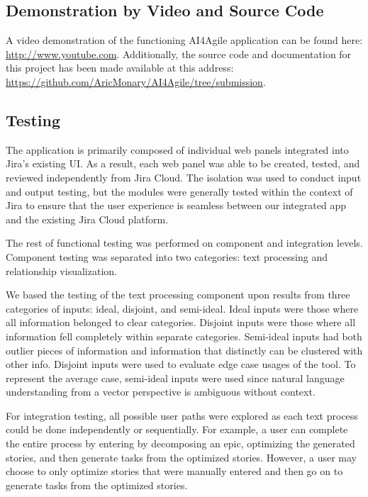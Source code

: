 \subsection{Demonstration by Video and Source Code}
A video demonstration of the functioning AI4Agile application can be found here: \url{http://www.youtube.com}. Additionally, the source code and documentation for this project has been made available at this address: \url{https://github.com/AricMonary/AI4Agile/tree/submission}.

\subsection{Testing}

The application is primarily composed of individual web panels integrated into Jira’s existing UI. As a result, each web panel was able to be created, tested, and reviewed independently from Jira Cloud. The isolation was used to conduct input and output testing, but the modules were generally tested within the context of Jira to ensure that the user experience is seamless between our integrated app and the existing Jira Cloud platform.

The rest of functional testing was performed on component and integration levels. Component testing was separated into two categories: text processing and relationship visualization.

We based the testing of the text processing component upon results from three categories of inputs: ideal, disjoint, and semi-ideal. Ideal inputs were those where all information belonged to clear categories. Disjoint inputs were those where all information fell completely within separate categories. Semi-ideal inputs had both outlier pieces of information and information that distinctly can be clustered with other info. Disjoint inputs were used to evaluate edge case usages of the tool. To represent the average case, semi-ideal inputs were used since natural language understanding from a vector perspective is ambiguous without context.

For integration testing, all possible user paths were explored as each text process could be done independently or sequentially. For example, a user can complete the entire process by entering by decomposing an epic, optimizing the generated stories, and then generate tasks from the optimized stories. However, a user may choose to only optimize stories that were manually entered and then go on to generate tasks from the optimized stories. 
